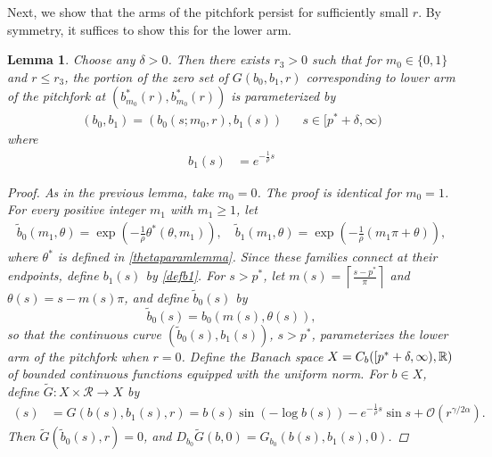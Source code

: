 \documentclass[12pt]{elsarticle}
\theoremstyle{plain}
\newtheorem{lemma}[theorem]{Lemma}
\theoremstyle{definition}
\theoremstyle{remark}
\numberwithin{theorem}{section}
\numberwithin{equation}{section}
\begin{document}
Next, we show that the arms of the pitchfork persist for sufficiently small $r$. By symmetry, it suffices to show this for the lower arm.

\begin{lemma}\label{armpersists}
Choose any $\delta > 0$. Then there exists $r_3 > 0$ such that for $m_0 \in \{0, 1\}$ and $r \leq r_3$, the portion of the zero set of $G(b_0, b_1, r)$ corresponding to lower arm of the pitchfork at $(b_{m_0}^*(r), b_{m_0}^*(r))$ is parameterized by
\begin{align*}
(b_0, b_1) = (b_0(s; m_0, r), b_1(s)) && s \in [p^* + \delta, \infty)
\end{align*}
where
\begin{align}\label{defb1}
b_1(s) &= e^{-\frac{1}{\rho}s} 
\end{align}

\begin{proof}
As in the previous lemma, take $m_0 = 0$. The proof is identical for $m_0 = 1$. For every positive integer $m_1$ with $m_1 \geq 1$, let
\begin{equation}\label{thetaparam2}
\begin{aligned}
\tilde{b}_0( m_1, \theta) = \exp\left( -\frac{1}{\rho}\theta^*(\theta, m_1) \right), \quad
\tilde{b}_1( m_1, \theta) = \exp\left( -\frac{1}{\rho}(m_1 \pi + \theta) \right),
\end{aligned}
\end{equation}
where $\theta^*$ is defined in \cref{thetaparamlemma}. Since these families connect at their endpoints, define $b_1(s)$ by \cref{defb1}. For $s > p^*$, let $m(s) = \left\lceil \frac{s - p^*}{\pi} \right\rceil$ and $\theta(s) = s - m(s) \pi$, and define $\tilde{b}_0(s)$ by
\begin{equation}\label{defb0}
\tilde{b}_0(s) = b_0(m(s), \theta(s)),
\end{equation}
so that the continuous curve $(\tilde{b}_0(s), b_1(s))$, $s > p^*$, parameterizes the lower arm of the pitchfork when $r = 0$. Define the Banach space $X = C_b([p^* + \delta, \infty), \mathbb{R})$ of bounded continuous functions equipped with the uniform norm. For $b \in X$, define $\tilde{G}: X \times \mathcal{R} \rightarrow X$ by
\begin{align*}
[\tilde{G}(b, r)](s) &= G(b(s), b_1(s), r) = b(s) \sin(-\log b(s) ) - e^{-\frac{1}{\rho}s} \sin s + \mathcal{O}(r^{\gamma/2\alpha}).
\end{align*}
Then $\tilde{G}(\tilde{b}_0(s), r) = 0$, and $D_{b_0} \tilde{G}(b, 0) = G_{b_0}(b(s), b_1(s), 0)$.


\end{proof}
\end{lemma}
\end{document}
